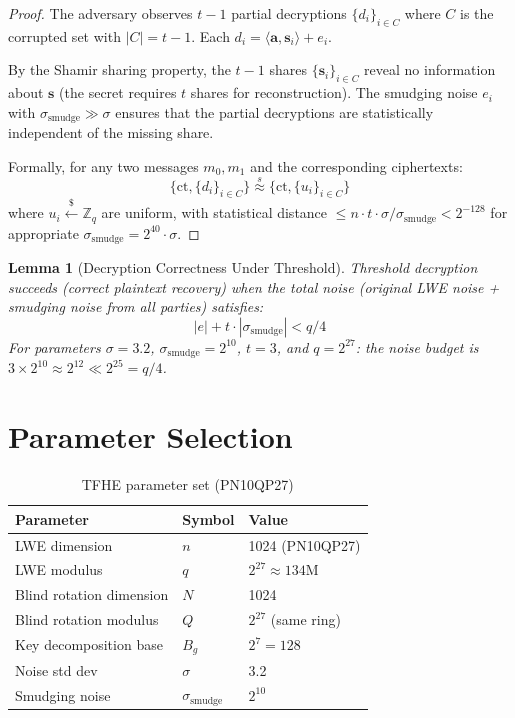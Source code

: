 \documentclass[11pt,a4paper]{article}
\newtheorem{lemma}[theorem]{Lemma}
\begin{document}
\begin{proof}
The adversary observes $t-1$ partial decryptions $\{d_i\}_{i \in C}$ where $C$ is the
corrupted set with $|C| = t - 1$. Each $d_i = \langle \mathbf{a}, \mathbf{s}_i \rangle + e_i$.

By the Shamir sharing property, the $t-1$ shares $\{\mathbf{s}_i\}_{i \in C}$ reveal no
information about $\mathbf{s}$ (the secret requires $t$ shares for reconstruction).
The smudging noise $e_i$ with $\sigma_{\text{smudge}} \gg \sigma$ ensures that the
partial decryptions are statistically independent of the missing share.

Formally, for any two messages $m_0, m_1$ and the corresponding ciphertexts:
\[
\{\text{ct}, \{d_i\}_{i \in C}\} \overset{s}{\approx} \{\text{ct}, \{u_i\}_{i \in C}\}
\]
where $u_i \stackrel{\$}{\leftarrow} \mathbb{Z}_q$ are uniform, with statistical
distance $\leq n \cdot t \cdot \sigma / \sigma_{\text{smudge}} < 2^{-128}$ for appropriate
$\sigma_{\text{smudge}} = 2^{40} \cdot \sigma$.
\end{proof}

\begin{lemma}[Decryption Correctness Under Threshold]
\label{lem:threshold-correctness}
Threshold decryption succeeds (correct plaintext recovery) when the total noise
(original LWE noise + smudging noise from all parties) satisfies:
\[
|e| + t \cdot |\sigma_{\text{smudge}}| < q/4
\]
For parameters $\sigma = 3.2$, $\sigma_{\text{smudge}} = 2^{10}$, $t = 3$, and
$q = 2^{27}$: the noise budget is $3 \times 2^{10} \approx 2^{12} \ll 2^{25} = q/4$.
\end{lemma}

\section{Parameter Selection}
\label{sec:params}

\begin{table}[h]
\centering
\begin{tabular}{@{}lll@{}}
\toprule
\textbf{Parameter} & \textbf{Symbol} & \textbf{Value} \\
\midrule
LWE dimension & $n$ & 1024 (PN10QP27) \\
LWE modulus & $q$ & $2^{27} \approx 134\text{M}$ \\
Blind rotation dimension & $N$ & 1024 \\
Blind rotation modulus & $Q$ & $2^{27}$ (same ring) \\
Key decomposition base & $B_g$ & $2^7 = 128$ \\
Noise std dev & $\sigma$ & 3.2 \\
Smudging noise & $\sigma_{\text{smudge}}$ & $2^{10}$ \\
\bottomrule
\end{tabular}
\caption{TFHE parameter set (PN10QP27)}
\label{tab:tfhe-params}
\end{table}
\end{document}
